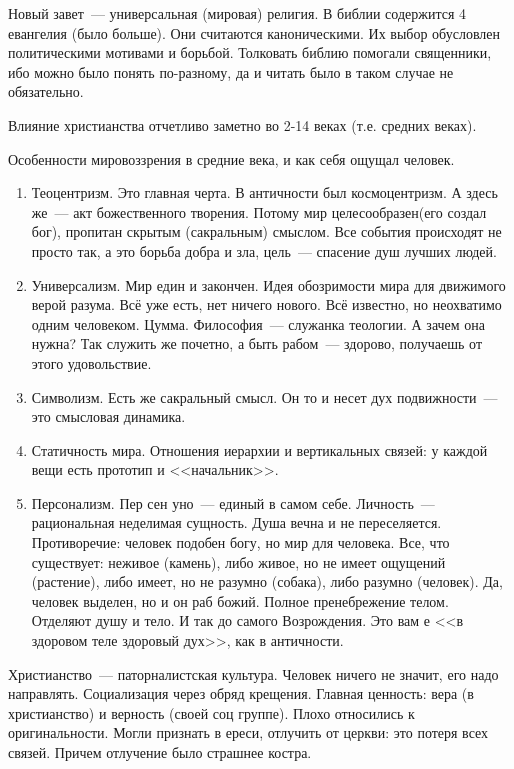 Новый завет~--- универсальная (мировая) религия.
В библии содержится 4 евангелия (было больше). Они считаются каноническими. Их выбор обусловлен политическими мотивами и борьбой. Толковать библию помогали священники, ибо можно было понять по-разному, да и читать было в таком случае не обязательно.

Влияние христианства отчетливо заметно во 2-14 веках (т.е. средних веках).

Особенности мировоззрения в средние века, и как себя ощущал человек.

\begin{enumerate}
	\item Теоцентризм. Это главная черта. В античности был космоцентризм. А здесь же~--- акт божественного творения. Потому мир целесообразен(его создал бог), пропитан скрытым (сакральным) смыслом. Все события происходят не просто так, а это борьба добра и зла, цель~--- спасение душ лучших людей.
	\item Универсализм. Мир един и закончен. Идея обозримости мира для движимого верой разума. Всё уже есть, нет ничего нового. Всё известно, но неохватимо одним человеком. Цумма. Философия~--- служанка теологии. А зачем она нужна? Так служить же почетно, а быть рабом~--- здорово, получаешь от этого удовольствие.
	\item Символизм. Есть же сакральный смысл. Он то и несет дух подвижности~--- это смысловая динамика.
	\item Статичность мира. Отношения иерархии и вертикальных связей: у каждой вещи есть прототип и <<начальник>>.
	\item Персонализм. Пер сен уно~--- единый в самом себе. Личность~--- рациональная неделимая сущность. Душа вечна и не переселяется. Противоречие: человек подобен богу, но мир для человека. Все, что существует: неживое (камень), либо живое, но не имеет ощущений (растение), либо имеет, но не разумно (собака), либо разумно (человек). Да, человек выделен, но и он раб божий. Полное пренебрежение телом. Отделяют душу и тело. И так до самого Возрождения. Это вам е <<в здоровом теле здоровый дух>>, как в античности.
\end{enumerate}

Христианство~--- паторналистская культура.
Человек ничего не значит, его надо направлять.
Социализация через обряд крещения.
Главная ценность: вера (в христианство) и верность (своей соц группе).
Плохо относились к оригинальности. Могли признать в ереси, отлучить от церкви: это потеря всех связей. Причем отлучение было страшнее костра.


